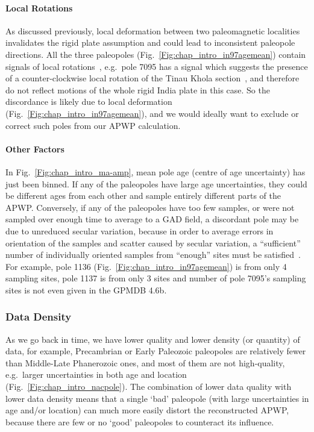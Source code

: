 \paragraph{Local Rotations}

As discussed previously, local deformation between two paleomagnetic localities
invalidates the rigid plate assumption and could lead to inconsistent paleopole
directions. All the three paleopoles (Fig.~\ref{Fig:chap_intro_in97agemean})
contain signals of local rotations~\citep{O82,G94}, e.g.\ pole 7095 has a signal
which suggests the presence of a counter-clockwise local rotation of the Tinau
Khola section~\citep{G94}, and therefore do not reflect motions of the whole
rigid India plate in this case. So the discordance is likely due to local
deformation (Fig.~\ref{Fig:chap_intro_in97agemean}), and we would ideally
want to exclude or correct such poles from our APWP calculation.

\paragraph{Other Factors}

In Fig.~\ref{Fig:chap_intro_ma-amp}, mean pole age (centre of age uncertainty)
has just been binned. If any of the paleopoles have large age uncertainties,
they could be different ages from each other and sample entirely different parts
of the APWP\@. Conversely, if any of the paleopoles have too few samples, or
were not sampled over enough time to average to a GAD field, a discordant pole
may be due to unreduced secular variation, because in order to average errors in
orientation of the samples and scatter caused by secular variation, a
``sufficient'' number of individually oriented samples from ``enough'' sites
must be satisfied~\citep{v90,B02,T20}. For example, pole 1136
(Fig.~\ref{Fig:chap_intro_in97agemean}) is from only 4 sampling sites, pole 1137
is from only 3 sites and number of pole 7095's sampling sites is not even given
in the GPMDB 4.6b.

\subsubsection{Data Density}\label{sec:datden}

As we go back in time, we have lower quality and lower density (or quantity) of
data, for example, Precambrian or Early Paleozoic paleopoles are relatively
fewer than Middle-Late Phanerozoic ones, and most of them are not high-quality,
e.g.\ larger uncertainties in both age and location
(Fig.~\ref{Fig:chap_intro_nacpole}). The combination of lower data quality with
lower data density means that a single `bad' paleopole (with large uncertainties
in age and/or location) can much more easily distort the reconstructed APWP,
because there are few or no `good' paleopoles to counteract its influence.

